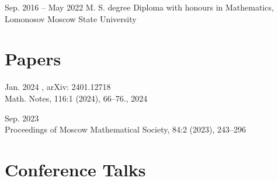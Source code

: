 \documentclass[11pt,letterpaper]{report}
\begin{document}
    \begin{tablist}

        \item[Sep. 2016 -- May 2022]  \tab{}M. S. degree Diploma with honours in Mathematics,\\ Lomonosov Moscow State University 

    \end{tablist}
    
    
    
    
    
    
      \section*{Papers}

    \begin{tablist}

        \item[Jan. 2024] , arXiv: 2401.12718\\ Math. Notes, 116:1 (2024), 66–76., 2024
        \item[Sep. 2023] \\ Proceedings of Moscow Mathematical Society, 84:2 (2023),  243–296
        
    \end{tablist}
    
    
        
    
    
    
    
    
     \section*{Conference Talks}
\end{document}
